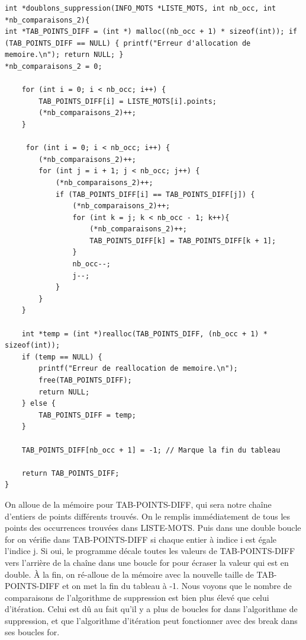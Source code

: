 \documentclass{article}
\begin{document}
\begin{lstlisting}[style=Cstyle]
int *doublons_suppression(INFO_MOTS *LISTE_MOTS, int nb_occ, int *nb_comparaisons_2){
int *TAB_POINTS_DIFF = (int *) malloc((nb_occ + 1) * sizeof(int)); if (TAB_POINTS_DIFF == NULL) { printf("Erreur d'allocation de memoire.\n"); return NULL; }
*nb_comparaisons_2 = 0;

    for (int i = 0; i < nb_occ; i++) {
        TAB_POINTS_DIFF[i] = LISTE_MOTS[i].points;
        (*nb_comparaisons_2)++;
    }

     for (int i = 0; i < nb_occ; i++) {
        (*nb_comparaisons_2)++;
        for (int j = i + 1; j < nb_occ; j++) {
            (*nb_comparaisons_2)++;
            if (TAB_POINTS_DIFF[i] == TAB_POINTS_DIFF[j]) {
                (*nb_comparaisons_2)++;
                for (int k = j; k < nb_occ - 1; k++){
                    (*nb_comparaisons_2)++;
                    TAB_POINTS_DIFF[k] = TAB_POINTS_DIFF[k + 1];
                }
                nb_occ--;
                j--;
            }
        }
    }

    int *temp = (int *)realloc(TAB_POINTS_DIFF, (nb_occ + 1) * sizeof(int));
    if (temp == NULL) {
        printf("Erreur de reallocation de memoire.\n");
        free(TAB_POINTS_DIFF);
        return NULL;
    } else {
        TAB_POINTS_DIFF = temp;
    }

    TAB_POINTS_DIFF[nb_occ + 1] = -1; // Marque la fin du tableau

    return TAB_POINTS_DIFF;
}
\end{lstlisting}
On alloue de la mémoire pour TAB-POINTS-DIFF, qui sera notre chaîne d'entiers de points différents trouvés. On le remplis immédiatement de tous les points des occurrences trouvées dans LISTE-MOTS. Puis dans une double boucle for on vérifie dans TAB-POINTS-DIFF si chaque entier à indice i est égale l'indice j. Si oui, le programme décale toutes les valeurs de TAB-POINTS-DIFF vers l'arrière de la chaîne dans une boucle for pour écraser la valeur qui est en double. À la fin, on ré-alloue de la mémoire avec la nouvelle taille de TAB-POINTS-DIFF et on met la fin du tableau à -1.\newline\newline
Nous voyons que le nombre de comparaisons de l'algorithme de suppression est bien plus élevé que celui d'itération. Celui est dû au fait qu'il y a plus de boucles for dans l'algorithme de suppression, et que l'algorithme d'itération peut fonctionner avec des break dans ses boucles for.
\end{document}
